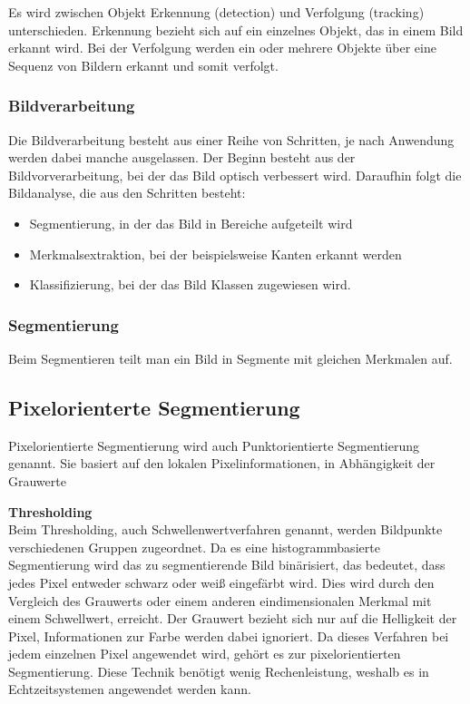     Es wird zwischen Objekt Erkennung (detection) \cite{obj_det_trak} und Verfolgung (tracking) unterschieden. Erkennung bezieht sich auf ein einzelnes Objekt, das in einem Bild erkannt wird. Bei der Verfolgung werden ein oder mehrere Objekte über eine Sequenz von Bildern erkannt und somit verfolgt.
    

    \subsubsection{Bildverarbeitung}
    Die Bildverarbeitung\cite{Bildverarbeitung}\cite{Bildverarbeitung2} besteht aus einer Reihe von Schritten, je nach Anwendung werden dabei manche ausgelassen.
    Der Beginn besteht aus der Bildvorverarbeitung, bei der das Bild optisch verbessert wird. Daraufhin folgt die Bildanalyse, die aus den Schritten besteht:
    \begin{itemize}
    \item Segmentierung, in der das Bild in Bereiche aufgeteilt wird
    \item Merkmalsextraktion, bei der beispielsweise Kanten erkannt werden
    \item Klassifizierung, bei der das Bild Klassen zugewiesen wird.
    \end{itemize}

    \subsubsection{Segmentierung}
    Beim Segmentieren teilt man ein Bild in Segmente mit gleichen Merkmalen auf.

    \subsection*{Pixelorienterte Segmentierung}
    Pixelorientierte Segmentierung\cite{Seg_punkt} wird auch Punktorientierte Segmentierung genannt. Sie basiert auf den lokalen Pixelinformationen, in Abhängigkeit der Grauwerte 

    \textbf{Thresholding}\\
    Beim Thresholding, auch Schwellenwertverfahren genannt, werden Bildpunkte verschiedenen Gruppen zugeordnet. Da es eine histogrammbasierte Segmentierung wird das zu segmentierende Bild binärisiert, das bedeutet, dass jedes Pixel entweder schwarz oder weiß eingefärbt wird. Dies wird durch den Vergleich des Grauwerts oder einem anderen eindimensionalen Merkmal mit einem Schwellwert, erreicht. Der Grauwert bezieht sich nur auf die Helligkeit der Pixel, Informationen zur Farbe werden dabei ignoriert. Da dieses Verfahren bei jedem einzelnen Pixel angewendet wird, gehört es zur pixelorientierten Segmentierung. Diese Technik benötigt wenig Rechenleistung, weshalb es in Echtzeitsystemen angewendet werden kann.

